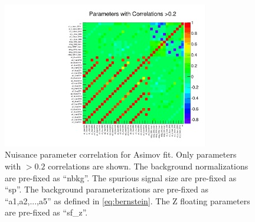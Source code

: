 

\begin{figure}[htbp]
  \centering
 \includegraphics[width=0.8\textwidth]{figures/VBF/Correlation.pdf}

\caption{Nuisance parameter correlation for Asimov fit. Only parameters with $>0.2$ correlations are shown. The background normalizations are pre-fixed as ``nbkg''. The spurious signal size are pre-fixed as ``sp''. The background parameterizations are pre-fixed as ``a1,a2,...,a5'' as defined in \ref{eq:bernstein}. The Z floating parameters are pre-fixed as ``sf\_z''. }
  \label{fig:corr_asimov}
\end{figure}

